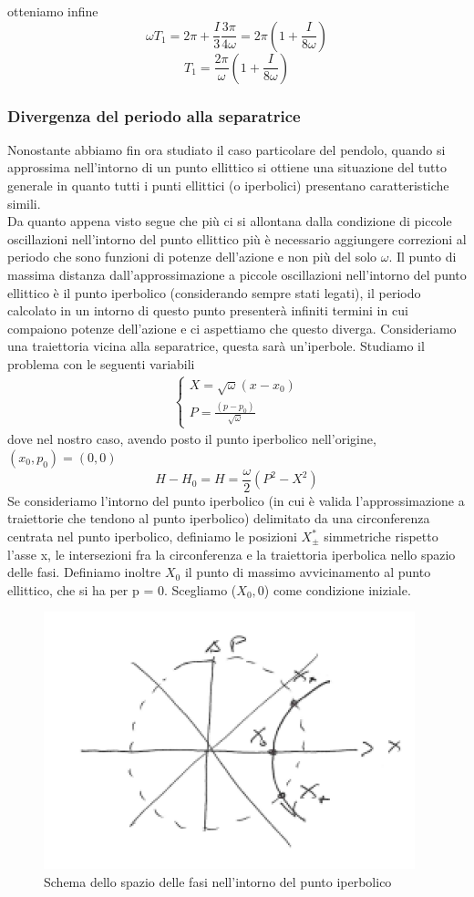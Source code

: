\documentclass[
10pt, %
a4paper, %
oneside, %
headinclude,footinclude, %
BCOR5mm, %
]{scrartcl}
\begin{document}
otteniamo infine
\[\omega T_1 = 2\pi + \frac{I}{3} \frac{3\pi}{4\omega} = 2\pi \left(1+\frac{I}{8\omega}\right)\]
\[T_1 = \frac{2\pi}{\omega}\left(1+\frac{I}{8\omega}\right)\]

\subsubsection{Divergenza del periodo alla separatrice}
Nonostante abbiamo fin ora studiato il caso particolare del pendolo, quando si approssima nell'intorno di un punto ellittico si ottiene una situazione del tutto generale in quanto tutti i punti ellittici (o iperbolici) presentano caratteristiche simili.\\
Da quanto appena visto segue che più ci si allontana dalla condizione di piccole oscillazioni nell'intorno del punto ellittico più è necessario aggiungere correzioni al periodo che sono funzioni di potenze dell'azione e non più del solo \(\omega\). Il punto di massima distanza dall'approssimazione a piccole oscillazioni nell'intorno del punto ellittico è il punto iperbolico (considerando sempre stati legati), il periodo calcolato in un intorno di questo punto presenterà infiniti termini in cui compaiono potenze dell'azione e ci aspettiamo che questo diverga.  Consideriamo una traiettoria vicina alla separatrice, questa sarà un'iperbole. Studiamo il problema con le seguenti variabili
\begin{align*}
		\begin{cases}
			X = \sqrt{\omega} (x- x_0)\\
			P = \frac{(p-p_0)}{\sqrt{\omega}}
		\end{cases}
\end{align*}
dove nel nostro caso, avendo posto il punto iperbolico nell'origine, \((x_0, p_0) = (0, 0)\)
\[H-H_0= H = \frac{\omega}{2}(P^2-X^2)\]
Se consideriamo l'intorno del punto iperbolico (in cui è valida l'approssimazione a traiettorie che tendono al punto iperbolico) delimitato da una circonferenza centrata nel punto iperbolico, definiamo le posizioni \(X^*_\pm\) simmetriche rispetto l'asse x, le intersezioni fra la circonferenza e la traiettoria iperbolica nello spazio delle fasi. Definiamo inoltre \(X_0\) il punto di massimo avvicinamento al punto ellittico, che si ha per p = 0. Scegliamo (\(X_0, 0\)) come condizione iniziale.
\begin{figure}[h!]
	\centering
	\includegraphics[width=0.6\linewidth]{"punto iperbolico"}
	\caption{Schema dello spazio delle fasi nell'intorno del punto iperbolico}
	\label{fig:punto-iperbolico}
\end{figure}
\end{document}
